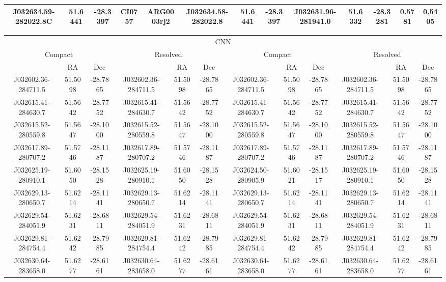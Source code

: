 \begin{table}
\begin{tabular}{ccccccccccccc}
J032634.59-282022.8C & 51.6441 & -28.3397 & CI0757 & ARG0003rj2 & J032634.58-282022.8 & 51.6441 & -28.3397 & J032631.96-281941.0 & 51.6332 & -28.3281 & 0.5781 & 0.5405 \\
      \hline\hline
    \end{tabular}
    \begin{tabular}{cccccccccccc}
      \hline\hline
\multicolumn{12}{c}{CNN}\\
 \multicolumn{3}{c}{Compact} & \multicolumn{3}{c}{Resolved} & \multicolumn{3}{c}{Compact} & \multicolumn{3}{c}{Resolved}\\
 & RA & Dec & & RA & Dec & & RA & Dec & & RA & Dec\\
      \hline
J032602.36-284711.5 & 51.5098 & -28.7865 & J032602.36-284711.5 & 51.5098 & -28.7865 & J032602.36-284711.5 & 51.5098 & -28.7865 & J032602.36-284711.5 & 51.5098 & -28.7865\\
J032615.41-284630.7 & 51.5642 & -28.7752 & J032615.41-284630.7 & 51.5642 & -28.7752 & J032615.41-284630.7 & 51.5642 & -28.7752 & J032615.41-284630.7 & 51.5642 & -28.7752\\
J032615.52-280559.8 & 51.5647 & -28.1000 & J032615.52-280559.8 & 51.5647 & -28.1000 & J032615.52-280559.8 & 51.5647 & -28.1000 & J032615.52-280559.8 & 51.5647 & -28.1000\\
J032617.89-280707.2 & 51.5746 & -28.1187 & J032617.89-280707.2 & 51.5746 & -28.1187 & J032617.89-280707.2 & 51.5746 & -28.1187 & J032617.89-280707.2 & 51.5746 & -28.1187\\
J032625.19-280910.1 & 51.6050 & -28.1528 & J032625.19-280910.1 & 51.6050 & -28.1528 & J032624.50-280905.9 & 51.6021 & -28.1517 & J032625.19-280910.1 & 51.6050 & -28.1528\\
J032629.13-280650.7 & 51.6214 & -28.1141 & J032629.13-280650.7 & 51.6214 & -28.1141 & J032629.13-280650.7 & 51.6214 & -28.1141 & J032629.13-280650.7 & 51.6214 & -28.1141\\
J032629.54-284051.9 & 51.6231 & -28.6811 & J032629.54-284051.9 & 51.6231 & -28.6811 & J032629.54-284051.9 & 51.6231 & -28.6811 & J032629.54-284051.9 & 51.6231 & -28.6811\\
J032629.81-284754.4 & 51.6242 & -28.7985 & J032629.81-284754.4 & 51.6242 & -28.7985 & J032629.81-284754.4 & 51.6242 & -28.7985 & J032629.81-284754.4 & 51.6242 & -28.7985\\
J032630.64-283658.0 & 51.6277 & -28.6161 & J032630.64-283658.0 & 51.6277 & -28.6161 & J032630.64-283658.0 & 51.6277 & -28.6161 & J032630.64-283658.0 & 51.6277 & -28.6161\\

\end{tabular}
\end{table}
